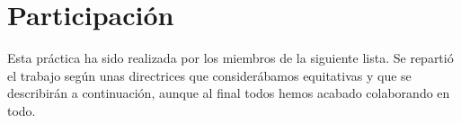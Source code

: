 \documentclass[12pt]{article}
\begin{document}

    
    

    \newpage

    \section{Participación}
    Esta práctica ha sido realizada por los miembros de la siguiente lista. Se repartió el trabajo según unas directrices que considerábamos equitativas y que se describirán a continuación, aunque al final todos hemos acabado colaborando en todo.
\end{document}
